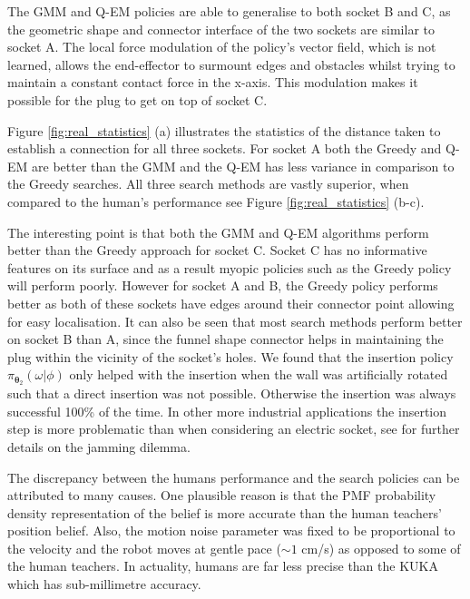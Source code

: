 \documentclass[final,5p,times,twocolumn]{elsarticle}
\newcommand{\Param}{\boldsymbol{\theta}}
\begin{document}
The GMM and Q-EM policies are able to generalise to both socket B and C, as the geometric shape and connector interface of the 
two sockets are similar to socket A. The local force modulation of the policy's vector field, which is not learned, allows the 
end-effector to surmount edges and obstacles whilst trying to maintain a constant contact force in the x-axis. 
This modulation makes it possible for the plug to get on top of socket C.

Figure \ref{fig:real_statistics} (a) illustrates the statistics of the distance taken to establish a connection for all three sockets.
For socket A both the Greedy and Q-EM are better than the GMM and the Q-EM has less variance in comparison to the Greedy searches.  
All three search methods are vastly superior, when compared to the human's performance see Figure \ref{fig:real_statistics} (b-c).

The interesting point is that both the GMM and Q-EM algorithms perform better than the Greedy approach for socket C. Socket C has no informative 
features on its surface and as a result myopic policies such as the Greedy policy will perform poorly. However for socket A 
and B, the Greedy policy performs better as both of these sockets have edges around their connector point allowing for easy localisation. 
It can also be seen that most search methods perform better on socket B than A, since the funnel shape connector helps in maintaining the plug 
within the vicinity of the socket's holes. We found that the insertion policy $\pi_{\Param_2}(\omega|\phi)$ only helped with the insertion 
when the wall was artificially rotated such that a direct insertion was not possible. Otherwise the insertion was always successful 100\% of 
the time. In other more industrial applications the insertion step is more problematic than when considering an electric socket, 
see \cite[Chap. 5]{Kronander2015} for further details on the jamming dilemma. 

The discrepancy between the humans performance and the search policies can be attributed to many causes. One plausible reason is 
that the PMF probability density representation of the belief is more accurate than the human teachers' position belief. 
Also, the motion noise parameter was fixed to be proportional to the velocity and the robot moves at gentle pace ($\sim1$ cm/s) as 
opposed to some of the human teachers. In actuality, humans are far less precise than the KUKA which has sub-millimetre accuracy.
\end{document}

